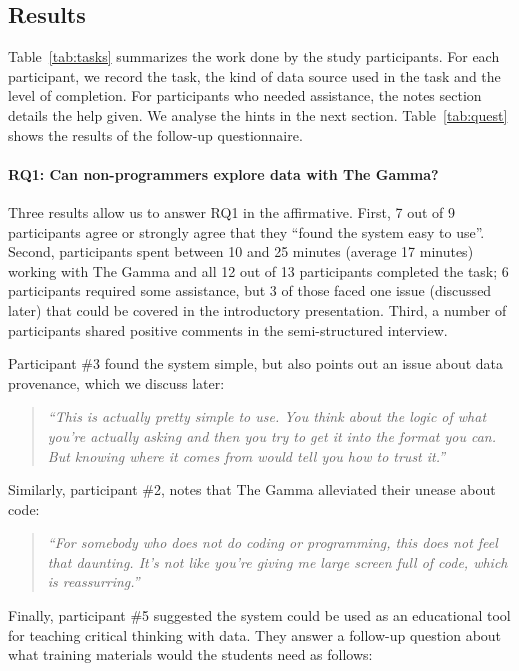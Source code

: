\documentclass[manuscript,review,anonymous]{acmart}
\begin{document}
\subsection{Results}
Table~\ref{tab:tasks} summarizes the work done by the study participants.
For each participant, we record the task, the kind of data source used in the task and the
level of completion. For participants who needed assistance, the notes section details the help
given. We analyse the hints in the next section. Table~\ref{tab:quest} shows the results of the
follow-up questionnaire.

\paragraph{RQ1: Can non-programmers explore data with The Gamma?}
Three results allow us to answer RQ1 in the affirmative. First, 7 out of 9
participants agree or strongly agree that they ``found the system easy to use''. Second,
participants spent between 10 and 25 minutes (average 17 minutes) working with The Gamma and
all 12 out of 13 participants completed the task; 6 participants required some assistance,
but 3 of those faced one issue (discussed later) that could be covered in the introductory
presentation. Third, a number of participants shared positive comments in the semi-structured
interview.

Participant \#3 found the system simple, but also points out an issue about data provenance,
which we discuss later:

\begin{quote}
\emph{``This is actually pretty simple to use. You think about the logic of what you're actually
  asking and then you try to get it into the format you can. But knowing where it comes from
  would tell you how to trust it.''}
\end{quote}

Similarly, participant \#2, notes that The Gamma alleviated their unease about code:

\begin{quote}
\emph{``For somebody who does not do coding or programming, this does not feel that daunting.
  It's not like you're giving me large screen full of code, which is reassurring.''}
\end{quote}

Finally, participant \#5 suggested the system could be used as an educational tool for teaching
critical thinking with data. They answer a follow-up question about what training materials would
the students need as follows:
\end{document}
